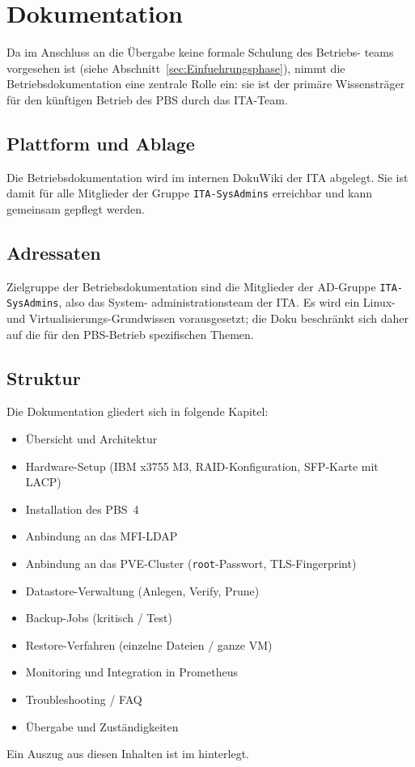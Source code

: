 \section{Dokumentation}
\label{sec:Dokumentation}

Da im Anschluss an die Übergabe keine formale Schulung des Betriebs-
teams vorgesehen ist (siehe Abschnitt~\ref{sec:Einfuehrungsphase}),
nimmt die Betriebsdokumentation eine zentrale Rolle ein: sie ist
der primäre Wissensträger für den künftigen Betrieb des \ac{PBS}
durch das \ac{ITA}-Team.

\subsection{Plattform und Ablage}
Die Betriebsdokumentation wird im internen DokuWiki der \ac{ITA}
abgelegt. Sie ist damit für alle Mitglieder der Gruppe
\texttt{ITA-SysAdmins} erreichbar und kann gemeinsam gepflegt
werden.

\subsection{Adressaten}
Zielgruppe der Betriebsdokumentation sind die Mitglieder der
\ac{AD}-Gruppe \texttt{ITA-SysAdmins}, also das System-
administrationsteam der \ac{ITA}. Es wird ein Linux- und
Virtualisierungs-Grundwissen vorausgesetzt; die Doku beschränkt
sich daher auf die für den \ac{PBS}-Betrieb spezifischen Themen.

\subsection{Struktur}
Die Dokumentation gliedert sich in folgende Kapitel:
\begin{itemize}
    \item Übersicht und Architektur
    \item Hardware-Setup (IBM x3755 M3, \ac{RAID}-Konfiguration,
          \ac{SFP}-Karte mit \ac{LACP})
    \item Installation des \ac{PBS}~4
    \item Anbindung an das \ac{MFI}-\ac{LDAP}
    \item Anbindung an das \ac{PVE}-Cluster (\texttt{root}-Passwort,
          TLS-Fingerprint)
    \item Datastore-Verwaltung (Anlegen, Verify, Prune)
    \item Backup-Jobs (kritisch / Test)
    \item Restore-Verfahren (einzelne Dateien / ganze \ac{VM})
    \item Monitoring und Integration in Prometheus
    \item Troubleshooting / FAQ
    \item Übergabe und Zuständigkeiten
\end{itemize}
Ein Auszug aus diesen Inhalten ist im
 hinterlegt.
